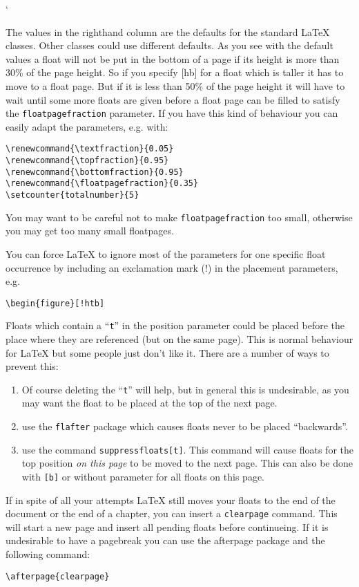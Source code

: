 `\documentclass[a4paper]{article}
\def\latex/{\protect\LaTeX{}}
\newcommand{\bs}{\symbol{'134}}
\newcommand{\Cmd}[1]{\texttt{\def\{{\char`\{}\def\}{\char`\}}\bs#1}}
\renewcommand{\topfraction}{0.9}
\renewcommand{\bottomfraction}{0.9}
\renewcommand{\textfraction}{0.05}
\begin{document}
The values in the righthand column are the defaults for the standard
\latex/ classes. Other classes could use different defaults. As you see
with the default values a float will not be put in the bottom of a page if
its height is more than 30\% of the page height. So if you specify [hb] for
a float which is taller it has to move to a float page. But if it is less
than 50\% of the page height it will have to wait until some more floats
are given before a float page can be filled to satisfy the
\Cmd{floatpagefraction} parameter. If you have this kind of behaviour you
can easily adapt the parameters, e.g. with:
\begin{verbatim}
\renewcommand{\textfraction}{0.05}
\renewcommand{\topfraction}{0.95}
\renewcommand{\bottomfraction}{0.95}
\renewcommand{\floatpagefraction}{0.35}
\setcounter{totalnumber}{5}
\end{verbatim}
You may want to be careful not to make \Cmd{floatpagefraction} too small,
otherwise you may get too many small floatpages.

You can force \latex/ to ignore most of the parameters for one specific float
occurrence by
including an exclamation mark (!) in the placement parameters, e.g.
\begin{verbatim}
\begin{figure}[!htb]
\end{verbatim}

Floats which contain a ``\texttt{t}'' in the position parameter could be
placed before the place where they are referenced (but on the same page).
This is normal behaviour for \latex/ but some people just don't like it.
There are a number of ways to prevent this: 
\begin{enumerate}
\item Of course deleting the ``\texttt{t}'' will help, but in general this is
  undesirable, as you may want the float to be placed at the top of the
  next page.
\item use the \texttt{flafter} package which causes floats never to be
  placed ``backwards''.
\item use the command \Cmd{suppressfloats[t]}.  This
  command will cause floats for the top position \emph{on this page} to be
  moved to the next page. This can also be done with \texttt{[b]} or
  without parameter for all floats on this page.
\end{enumerate}

If in spite of all your attempts \latex/ still moves your floats to the end
of the document or the end of a chapter, you can insert a \Cmd{clearpage}
command. This will start a new page and insert all pending floats before
continueing. If it is undesirable to have a pagebreak you can use the
\textsf{afterpage} package and the following command:
\begin{verbatim}
\afterpage{clearpage}
\end{verbatim}
\end{document}
